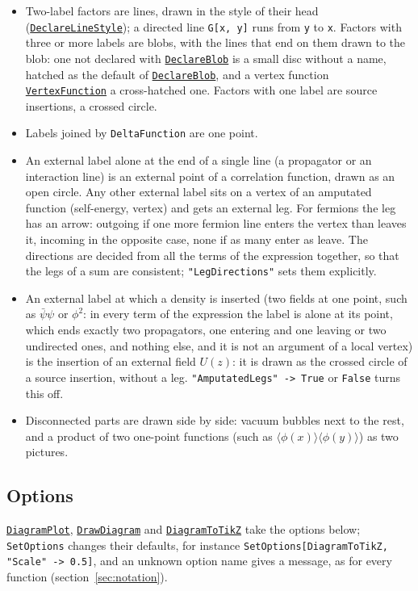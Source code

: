 \documentclass[11pt,a4paper]{article}
\newcommand{\pkg}[1]{\texttt{#1}}
\newcommand{\fnref}[1]{\hyperref[fn:#1]{\pkg{#1}}}
\newcommand{\opt}[1]{\texttt{"#1"}}
\begin{document}
\begin{itemize}
\item Two-label factors are lines, drawn in the style of their head (\fnref{DeclareLineStyle}); a directed line
  \pkg{G[x, y]} runs from \pkg{y} to \pkg{x}. Factors with three or more labels are blobs, with
  the lines that end on them drawn to the blob: one not declared with \fnref{DeclareBlob} is a small disc without a name,
  hatched as the default of \fnref{DeclareBlob}, and a vertex function \fnref{VertexFunction} a cross-hatched one. Factors with one label are source insertions, a crossed circle.
\item Labels joined by \pkg{DeltaFunction} are one point.
\item An external label alone at the end of a single line (a propagator or an interaction line) is an external point of a
  correlation function, drawn as an open circle. Any other external label sits on a vertex of an amputated function
  (self-energy, vertex) and gets an external leg. For fermions the leg has an arrow: outgoing if one more fermion line
  enters the vertex than leaves it, incoming in the opposite case, none if as many enter as leave. The directions are
  decided from all the terms of the expression together, so that the legs of a sum are consistent; \opt{LegDirections}
  sets them explicitly.
\item An external label at which a density is inserted (two fields at one point, such as $\bar\psi\psi$ or $\phi^2$: in
  every term of the expression the label is alone at its point, which ends exactly two propagators, one entering and one
  leaving or two undirected ones, and nothing else, and it is not an argument of a local vertex) is the insertion of an
  external field $U(z)$: it is drawn as the crossed circle of a source insertion, without a leg.
  \opt{AmputatedLegs}~\pkg{->}~\pkg{True} or \pkg{False} turns this off.
\item Disconnected parts are drawn side by side: vacuum bubbles next to the rest, and a product of two one-point functions
  (such as $\langle\phi(x)\rangle\langle\phi(y)\rangle$) as two pictures.
\end{itemize}

\subsection{Options}\label{sec:options}

\fnref{DiagramPlot}, \fnref{DrawDiagram} and \fnref{DiagramToTikZ} take the options below; \pkg{SetOptions} changes their
defaults, for instance \pkg{SetOptions[DiagramToTikZ, "Scale" -> 0.5]}, and an unknown option name gives a message, as for
every function (section~\ref{sec:notation}).
\end{document}
